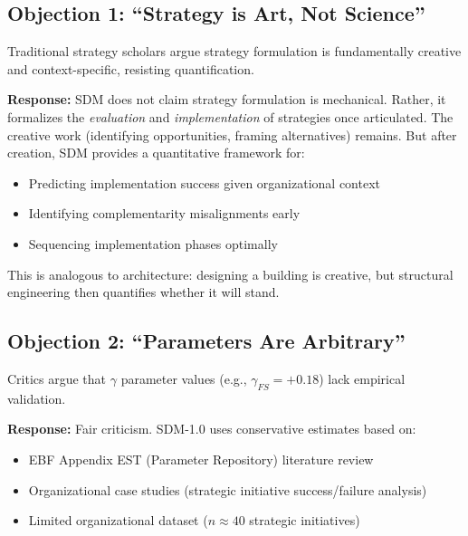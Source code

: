 \subsection{Objection 1: ``Strategy is Art, Not Science''}

\begin{tcolorbox}[colback=red!5!white, colframe=red!50!black,
    title=Objection: Strategy Cannot Be Formalized]
Traditional strategy scholars argue strategy formulation is fundamentally creative and context-specific, resisting quantification.
\end{tcolorbox}

\textbf{Response:} SDM does not claim strategy formulation is mechanical. Rather, it formalizes the \textit{evaluation} and \textit{implementation} of strategies once articulated. The creative work (identifying opportunities, framing alternatives) remains. But after creation, SDM provides a quantitative framework for:
\begin{itemize}
    \item Predicting implementation success given organizational context
    \item Identifying complementarity misalignments early
    \item Sequencing implementation phases optimally
\end{itemize}

This is analogous to architecture: designing a building is creative, but structural engineering then quantifies whether it will stand.

\subsection{Objection 2: ``Parameters Are Arbitrary''}

\begin{tcolorbox}[colback=red!5!white, colframe=red!50!black,
    title=Objection: Complementarity Values ($\gamma$) Are Ad-hoc]
Critics argue that $\gamma$ parameter values (e.g., $\gamma_{FS} = +0.18$) lack empirical validation.
\end{tcolorbox}

\textbf{Response:} Fair criticism. SDM-1.0 uses conservative estimates based on:
\begin{itemize}
    \item EBF Appendix EST (Parameter Repository) literature review
    \item Organizational case studies (strategic initiative success/failure analysis)
    \item Limited organizational dataset ($n \approx 40$ strategic initiatives)
\end{itemize}

